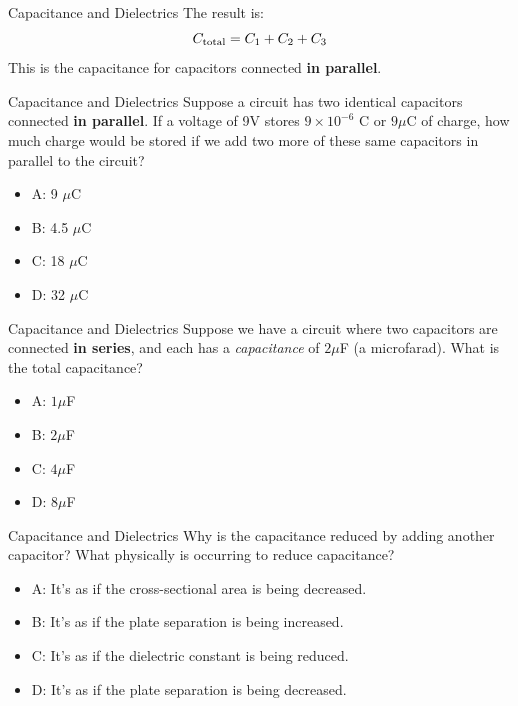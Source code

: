 \documentclass{beamer}
\begin{document}
\begin{frame}{Capacitance and Dielectrics}
The result is:
\begin{equation}
C_{\rm total} = C_1+C_2+C_3
\end{equation}
This is the capacitance for capacitors connected \textbf{in parallel}.
\end{frame}

\begin{frame}{Capacitance and Dielectrics}
Suppose a circuit has two identical capacitors connected \textbf{in parallel}.  If a voltage of 9V stores $9 \times 10^{-6}$ C or $9\mu$C of charge, how much charge would be stored if we add two more of these same capacitors in parallel to the circuit?
\begin{itemize}
\item A: 9 $\mu$C
\item B: 4.5 $\mu$C
\item C: 18 $\mu$C
\item D: 32 $\mu$C
\end{itemize}
\end{frame}

\begin{frame}{Capacitance and Dielectrics}
Suppose we have a circuit where two capacitors are connected \textbf{in series}, and each has a \textit{capacitance} of $2\mu$F (a microfarad).  What is the total capacitance?
\begin{itemize}
\item A: $1\mu$F
\item B: $2\mu$F
\item C: $4\mu$F
\item D: $8\mu$F
\end{itemize}
\end{frame}

\begin{frame}{Capacitance and Dielectrics}
Why is the capacitance reduced by adding another capacitor?  What physically is occurring to reduce capacitance?
\begin{itemize}
\item A: It's as if the cross-sectional area is being decreased.
\item B: It's as if the plate separation is being increased.
\item C: It's as if the dielectric constant is being reduced.
\item D: It's as if the plate separation is being decreased.
\end{itemize}
\end{frame}
\end{document}
